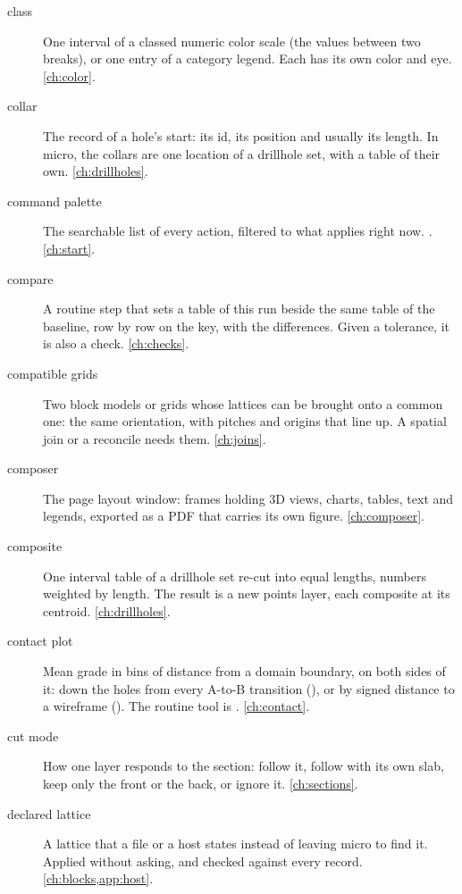 \begin{description}
\item[class] One interval of a classed numeric color scale (the values between two breaks), or one
  entry of a category legend. Each has its own color and eye. \cref{ch:color}.

\item[collar] The record of a hole's start: its id, its position and usually its length. In micro,
  the collars are one location of a drillhole set, with a table of their own. \cref{ch:drillholes}.

\item[command palette] The searchable list of every action, filtered to what applies right now.
  . \cref{ch:start}.

\item[compare] A routine step that sets a table of this run beside the same table of the baseline,
  row by row on the key, with the differences. Given a tolerance, it is also a check. \cref{ch:checks}.

\item[compatible grids] Two block models or grids whose lattices can be brought onto a common one:
  the same orientation, with pitches and origins that line up. A spatial join or a reconcile needs
  them. \cref{ch:joins}.

\item[composer] The page layout window: frames holding 3D views, charts, tables, text and legends,
  exported as a PDF that carries its own figure. \cref{ch:composer}.

\item[composite] One interval table of a drillhole set re-cut into equal lengths, numbers weighted
  by length. The result is a new points layer, each composite at its centroid.
  \cref{ch:drillholes}.

\item[contact plot] Mean grade in bins of distance from a domain boundary, on both sides of it:
  down the holes from every A-to-B transition (), or by signed distance to a
  wireframe (). The routine tool is . \cref{ch:contact}.

\item[cut mode] How one layer responds to the section: follow it, follow with its own slab, keep
  only the front or the back, or ignore it. \cref{ch:sections}.

\item[declared lattice] A lattice that a file or a host states instead of leaving micro to find
  it. Applied without asking, and checked against every record. \cref{ch:blocks,app:host}.


\end{description}
